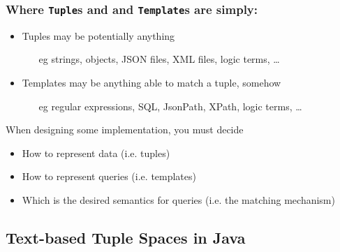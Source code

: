 \documentclass[presentation]{beamer}\mode<presentation>{\usetheme{AMSCesenaPurpleAndGold}}
\begin{document}
\begin{frame}%
\frametitle{Where \texttt{Tuple}s and and \texttt{Template}s are simply:}

\columnsHH{

}{

}

\begin{itemize}
\item Tuples may be potentially anything
%
\begin{itemize}
	\item[eg] strings, objects, JSON files, XML files, logic terms, \ldots
\end{itemize}

\item Templates may be anything able to match a tuple, somehow
%
\begin{itemize}
	\item[eg] regular expressions, SQL, JsonPath, XPath, logic terms, \ldots
\end{itemize}
\end{itemize}

\vfill

\begin{block}{When designing some \linda{} implementation, you must decide}
	\begin{itemize}
		\item How to represent data (i.e. \alert{tuples})
		\item How to represent queries (i.e. \alert{templates})
		\item Which is the desired semantics for queries (i.e. the \alert{matching} mechanism)
	\end{itemize}
\end{block}

\end{frame}

\subsection{Text-based Tuple Spaces in Java}
\end{document}
